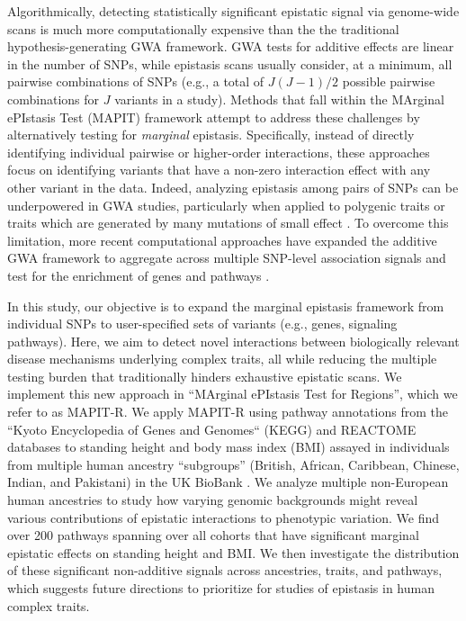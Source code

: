 \documentclass[10pt,a4paper]{article}
\begin{document}
Algorithmically, detecting statistically significant epistatic signal via genome-wide scans is much more computationally expensive than the the traditional hypothesis-generating GWA framework. GWA tests for additive effects are linear in the number of SNPs, while epistasis scans usually consider, at a minimum, all pairwise combinations of SNPs (e.g., a total of $J(J - 1)/2$ possible pairwise combinations for $J$ variants in a study). Methods that fall within the MArginal ePIstasis Test (MAPIT) framework \cite{Crawford2017a,Crawford:2018aa,Moore:2019aa,Wang:2019aa} attempt to address these challenges by alternatively testing for \textit{marginal} epistasis. Specifically, instead of directly identifying individual pairwise or higher-order interactions, these approaches focus on identifying variants that have a non-zero interaction effect with any other variant in the data. Indeed, analyzing epistasis among pairs of SNPs can be underpowered in GWA studies, particularly when applied to polygenic traits or traits which are generated by many mutations of small effect \cite{Zhou2013,Yang:2014aa,Bulik-Sullivan:2015aa,Wray:2018aa}. To overcome this limitation, more recent computational approaches have expanded the additive GWA framework to aggregate across multiple SNP-level association signals and test for the enrichment of genes and pathways \cite{Subramanian2005,Cantor2010,Wang2010b,Lee2012,Carbonetto2013,Mooney2014,Gamazon2015,de2016,Nakka2016,Zhu2018,Sun2019,Cheng2020}. 

In this study, our objective is to expand the marginal epistasis framework from individual SNPs to user-specified sets of variants (e.g., genes, signaling pathways). Here, we aim to detect novel interactions between biologically relevant disease mechanisms underlying complex traits, all while reducing the multiple testing burden that traditionally hinders exhaustive epistatic scans. We implement this new approach in ``MArginal ePIstasis Test for Regions'', which we refer to as MAPIT-R. We apply MAPIT-R using pathway annotations from the ``Kyoto Encyclopedia of Genes and Genomes`` (KEGG) and REACTOME databases \cite{Liberzon2011} to standing height and body mass index (BMI) assayed in individuals from multiple human ancestry ``subgroups'' (British, African, Caribbean, Chinese, Indian, and Pakistani) in the UK BioBank \cite{Sudlow2015}. We analyze multiple non-European human ancestries to study how varying genomic backgrounds might reveal various contributions of epistatic interactions to phenotypic variation. We find over 200 pathways spanning over all cohorts that have significant marginal epistatic effects on standing height and BMI. We then investigate the distribution of these significant non-additive signals across ancestries, traits, and pathways, which suggests future directions to prioritize for studies of epistasis in human complex traits.
\end{document}
